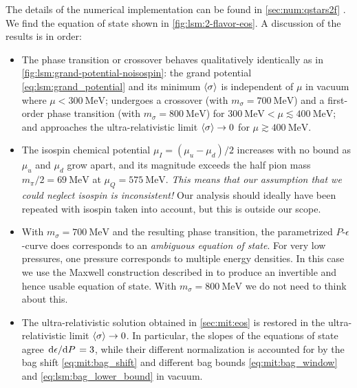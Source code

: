 The details of the numerical implementation can be found in \cref{sec:num:qstars2f} .
We find the equation of state shown in \cref{fig:lsm:2-flavor-eos}.
A discussion of the results is in order:
\begin{itemize}
\item The phase transition or crossover behaves qualitatively identically as in \cref{fig:lsm:grand-potential-noisospin}:
      the grand potential \eqref{eq:lsm:grand_potential} and its minimum $\langle \sigma \rangle$ is independent of $\mu$ in vacuum where $\mu < \SI{300}{\mega\electronvolt}$;
      undergoes a crossover (with $m_\sigma=\SI{700}{\mega\electronvolt}$) and a first-order phase transition (with $m_\sigma=\SI{800}{\mega\electronvolt}$) for $\SI{300}{\mega\electronvolt} < \mu \lesssim \SI{400}{\mega\electronvolt}$;
      and approaches the ultra-relativistic limit $\langle \sigma \rangle\rightarrow 0$ for $\mu \gtrsim \SI{400}{\mega\electronvolt}$.
\item The isospin chemical potential $\mu_I=(\mu_u-\mu_d)/2$ increases with no bound as $\mu_u$ and $\mu_d$ grow apart,
      and its magnitude exceeds the half pion mass $m_\pi/2 = \SI{69}{\mega\electronvolt}$ at $\mu_Q = \SI{575}{\mega\electronvolt}$.
      \emph{This means that our assumption that we could neglect isospin is inconsistent!}
      Our analysis should ideally have been repeated with isospin taken into account, but this is outside our scope.\
\item With $m_\sigma=\SI{700}{\mega\electronvolt}$ and the resulting phase transition,
      the parametrized $P$-$\epsilon$-curve does corresponds to an \emph{ambiguous equation of state}.
      For very low pressures, one pressure corresponds to multiple energy densities.
      In this case we use the Maxwell construction described in  to produce an invertible and hence usable equation of state.
      With $m_\sigma=\SI{800}{\mega\electronvolt}$ we do not need to think about this.
\item The ultra-relativistic solution obtained in \cref{sec:mit:eos} is restored in the ultra-relativistic limit $\langle \sigma \rangle \rightarrow 0$.
      In particular, the slopes of the equations of state agree $\odv{\epsilon}/{P} = 3$,
      while their different normalization is accounted for by the bag shift \eqref{eq:mit:bag_shift} and different bag bounds \eqref{eq:mit:bag_window} and \eqref{eq:lsm:bag_lower_bound} in vacuum.

\end{itemize}
